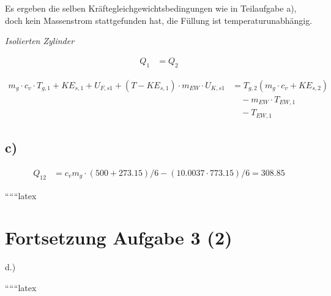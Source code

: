 Es ergeben die selben Kräftegleichgewichtsbedingungen wie in Teilaufgabe a), doch kein Massenstrom stattgefunden hat, die Füllung ist temperaturunabhängig.

\textit{Isolierten Zylinder}

\begin{align*}
    Q_1 &= Q_2
\end{align*}

\begin{align*}
    m_{g} \cdot c_v \cdot T_{g,1} + K E_{s,1} + U_{F,s1} + (T - K E_{s,1}) \cdot m_{EW} \cdot U_{K,s1} &= T_{g,2} \left( m_{g} \cdot c_v + K E_{s,2} \right) \\
    & \quad - m_{EW} \cdot T_{EW,1} \\
    & \quad - T_{EW,1}
\end{align*}

\subsection*{c)}
\begin{align*}
    Q_{12} &= c_v m_g \cdot \left( 500 + 273.15 \right) / 6 - \left( 10.0037 \cdot 773.15 \right) / 6 = 308.85
\end{align*}

``````latex


\section*{Fortsetzung Aufgabe 3 (2)}

d.)

``````latex


